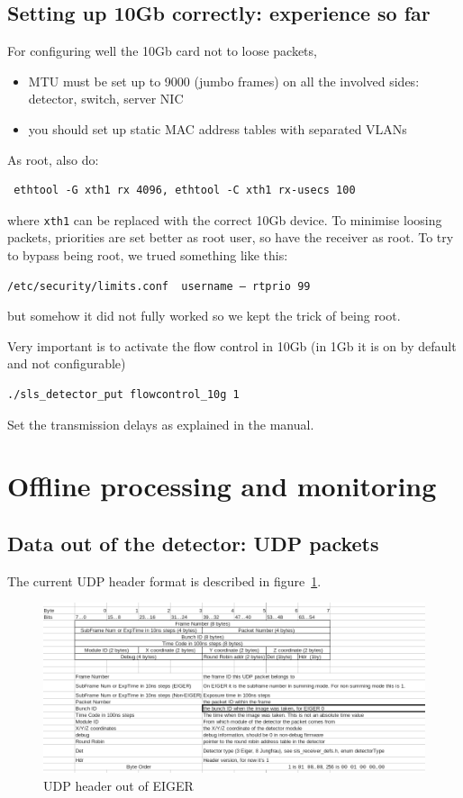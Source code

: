 \documentclass{article}
\begin{document}
\begin{itemize}
\end{itemize}
\subsection{Setting up 10Gb correctly: experience so far}\label{10g}

For configuring well the 10Gb card not to loose packets, 
\begin{itemize}
\item MTU must be set up to 9000 (jumbo frames) on all the involved sides: detector, switch, server NIC
\item you should set up static MAC address tables with separated VLANs
\end{itemize}
As root, also do:
\begin{verbatim}
 ethtool -G xth1 rx 4096, ethtool -C xth1 rx-usecs 100 
\end{verbatim}
where {\tt{xth1}} can be replaced with the correct 10Gb device. To minimise loosing packets, priorities are set better as root user, so have the receiver as root.
To try to bypass being root, we trued something like this:
\begin{verbatim}
/etc/security/limits.conf  username – rtprio 99
\end{verbatim}
but somehow it did  not fully worked  so we kept the trick of being root.

Very important is to activate the flow control in 10Gb (in 1Gb it is on by default and not configurable)
\begin{verbatim}
./sls_detector_put flowcontrol_10g 1
\end{verbatim}
Set the transmission delays as explained in the manual.

\section{Offline processing and monitoring}

\subsection{Data out of the detector: UDP packets}

The current UDP header format is described in figure~\ref{UDPheader}.
\begin{figure}[t]
\begin{center}
\includegraphics[width=1.2\textwidth]{EIGERUDPHeader}
\end{center}
\caption{UDP header out of EIGER}
\label{UDPheader}
\end{figure}
 
\end{document}
